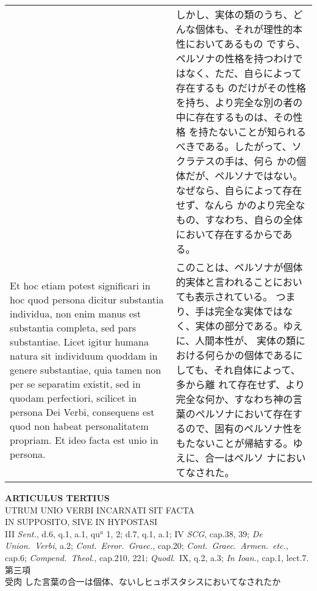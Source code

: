 \documentclass[10pt]{jsarticle} %
\begin{document}
\begin{longtable}{p{21em}p{21em}}
&

しかし、実体の類のうち、どんな個体も、それが理性的本性においてあるもの
ですら、ペルソナの性格を持つわけではなく、ただ、自らによって存在するも
のだけがその性格を持ち、より完全な別の者の中に存在するものは、その性格
を持たないことが知られるべきである。したがって、ソクラテスの手は、何ら
かの個体だが、ペルソナではない。なぜなら、自らによって存在せず、なんら
かのより完全なもの、すなわち、自らの全体において存在するからである。


\\


Et hoc etiam potest significari in hoc quod persona dicitur substantia
individua, non enim manus est substantia completa, sed pars
substantiae. Licet igitur humana natura sit individuum quoddam in
genere substantiae, quia tamen non per se separatim existit, sed in
quodam perfectiori, scilicet in persona Dei Verbi, consequens est quod
non habeat personalitatem propriam. Et ideo facta est unio in persona.


&

このことは、ペルソナが個体的実体と言われることにおいても表示されている。
つまり、手は完全な実体ではなく、実体の部分である。ゆえに、人間本性が、
実体の類における何らかの個体であるにしても、それ自体によって、多から離
れて存在せず、より完全な何か、すなわち神の言葉のペルソナにおいて存在す
るので、固有のペルソナ性をもたないことが帰結する。ゆえに、合一はペルソ
ナにおいてなされた。


\end{longtable}
\newpage





\begin{center}
{\Large {\bf ARTICULUS TERTIUS}}\\ {\large UTRUM UNIO VERBI INCARNATI
SIT FACTA \\IN SUPPOSITO, SIVE IN HYPOSTASI}\\ {\footnotesize III
{\itshape Sent.}, d.6, q.1, a.1, qu$^a$ 1, 2; d.7, q.1, a.1; IV
{\itshape SCG}, cap.38, 39; {\itshape De Union.~Verbi}, a.2; {\itshape
Cont.~Error.~Graec.}, cap.20; {\itshape Cont.~Graec.~Armen.~etc.},
cap.6; {\itshape Compend.~Theol.}, cap.210, 221; {\itshape Quodl}.~IX,
q.2, a.3; {\itshape In Ioan.}, cap.1, lect.7.}\\ {\Large 第三項\\受肉
した言葉の合一は個体、ないしヒュポスタシスにおいてなされたか}
\end{center}
\end{document}
